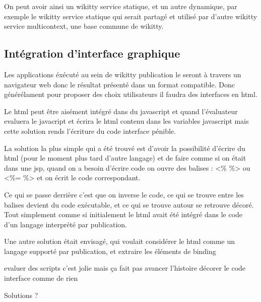 On peut avoir ainsi un wikitty service statique, et un autre dynamique, par
exemple le wikitty service statique qui serait partagé et utilisé par d'autre
wikitty service multicontext, une base commune de wikitty.

\subsection{Intégration d'interface graphique}

Les applications éxécuté au sein de wikitty publication le seront à travers 
un navigateur web donc le résultat présenté dans un format compatible.
Donc générélament pour proposer des choix utilisateurs il faudra des interfaces
en html.

Le html peut être aisément intégré dans du javascript et quand l'évaluateur
evaluera le javacript et écrira le html contenu dans les variables javascript
mais cette solution rends l'écriture du code interface pénible.


La solution la plus simple qui a été trouvé est d'avoir la possibilité d'écrire 
du html (pour le moment plus tard d'autre langage) et de faire comme si on était
dans une jsp, quand on a besoin d'écrire code on ouvre des balises : <\% \%>
ou <\%= \%> et on écrit le code correspondant.

Ce qui se passe derrière c'est que on inverse le code, ce qui se trouve entre
les balises devient du code exécutable, et ce qui se trouve autour se retrouve
décoré. Tout simplement comme si initialement le html avait été intégré dans
le code d'un langage interprété par publication.

Une autre solution était envisagé, qui voulait considérer le html comme un langage
supporté par publication, et extraire les éléments de binding 


evaluer des scripts c'est jolie mais ça fait pas avancer l'histoire
décorer le code interface comme de rien

Solutions ?
